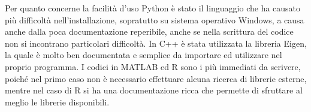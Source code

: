 \documentclass[a4paper,12pt]{article}
\begin{document}
\noindent Per quanto concerne la facilità d'uso Python è stato il linguaggio che ha causato più difficoltà nell'installazione, sopratutto su sistema operativo Windows, a causa anche dalla poca documentazione reperibile, anche se nella scrittura del codice non si incontrano particolari difficoltà. In C++ è stata utilizzata la libreria Eigen, la quale è molto ben documentata e semplice da importare ed utilizzare nel proprio programma.
I codici in MATLAB ed R sono i più immediati da scrivere, poiché nel primo caso non è necessario effettuare alcuna ricerca di librerie esterne, mentre nel caso di R si ha una documentazione ricca che permette di sfruttare al meglio le librerie disponibili.
\end{document}
